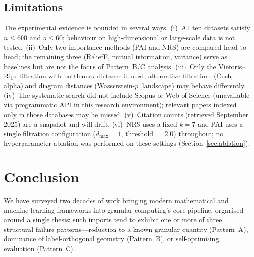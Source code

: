 \subsection*{Limitations}
\label{sec:limitations}

The experimental evidence is bounded in several ways.
(i)~All ten datasets satisfy $n \leq 600$ and $d \leq 60$; behaviour on
high-dimensional or large-scale data is not tested.
(ii)~Only two importance methods (PAI and NRS) are compared head-to-head;
the remaining three (ReliefF, mutual information, variance) serve as
baselines but are not the focus of Pattern~B/C analysis.
(iii)~Only the Vietoris--Rips filtration with bottleneck distance is used;
alternative filtrations (\v{C}ech, alpha) and diagram distances
(Wasserstein-$p$, landscape) may behave differently.
(iv)~The systematic search did not include Scopus or Web of Science
(unavailable via programmatic API in this research environment); relevant
papers indexed only in those databases may be missed.
(v)~Citation counts (retrieved September 2025) are a snapshot and
will drift.
(vi)~NRS uses a fixed $k=7$ and PAI uses a single filtration configuration
($d_{\max}=1$, threshold $=2.0$) throughout; no hyperparameter ablation was
performed on these settings (Section~\ref{sec:ablation}).

\section{Conclusion}
\label{sec:conclusion}

We have surveyed two decades of work bringing modern mathematical and
machine-learning frameworks into granular computing's core pipeline, organised
around a single thesis: such imports tend to exhibit one or more of three structural failure
patterns---reduction to a known granular quantity (Pattern~A), dominance of
label-orthogonal geometry (Pattern~B), or self-optimising evaluation (Pattern~C).

